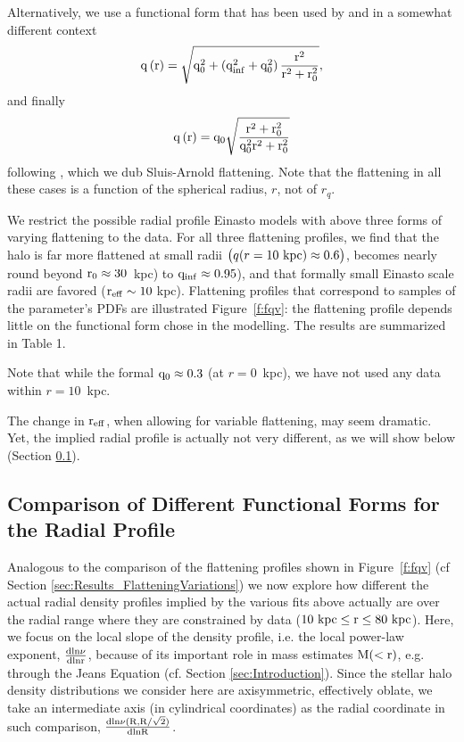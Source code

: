 \documentclass[12pt,preprint]{aastex}
\begin{document}
Alternatively, we use a functional form that has been used by \citep{Osipkov1979} and \citep{Merritt1985} in a somewhat different context
\begin{equation}
\rm q\left(r\right)=\sqrt{q_0^2+\left(q_{inf}^2+q_0^2\right)\frac{r^2}{r^2+r_0^2}},
\end{equation}
and finally 
\begin{equation}
\rm q\left(r\right)=q_0\sqrt{\frac{r^2+r_0^2}{q_0^2r^2+r_0^2}}
\end{equation}
following \citet{Sluis1998}, which we dub Sluis-Arnold flattening. 
Note that the flattening in all these cases is a function of the spherical radius, $r$, not of $r_q$.

We restrict the possible radial profile Einasto models with above three forms of varying flattening to the data. For all three flattening profiles, we find that the halo is far more flattened at small radii $\bigl ( q(r=10\rm~kpc)\approx 0.6\bigr )$, becomes nearly round beyond  $\rm r_0\approx 30$~kpc)  to $\rm q_{inf}\approx 0.95$),  and that formally small Einasto scale radii are favored ($\rm r_{eff} \sim 10~$kpc). Flattening profiles that correspond to samples of the parameter's PDFs are illustrated Figure~\ref{f:fqv}: the flattening profile depends little on the functional form chose in the modelling. The results are summarized in Table 1.   

Note that while the formal $\rm q_0\approx 0.3$ (at $r=0$~kpc), we have not used any data within $r=10$~kpc. 

The change in $\rm r_{eff}$, when allowing for variable flattening, may seem dramatic. Yet,
the implied radial profile is actually not very different, as we will show below (Section \ref{sec:ModelComparison}).

\subsection{Comparison of Different Functional Forms for the Radial Profile}\label{sec:ModelComparison}

Analogous to the comparison of the flattening profiles shown in Figure~\ref{f:fqv} 
(cf Section \ref{sec:Results_FlatteningVariations}) we now explore how different the 
actual radial density profiles implied by the various fits above actually are over the radial range where they are constrained by data ($10~\rm kpc \le \rm r \le 80~\rm kpc$). Here, we focus
on the local slope of the density profile, i.e. the local power-law exponent, $\rm \frac{dln\nu}{dlnr}$, because of its important role in mass estimates $\rm M(<r)$, e.g. through the Jeans Equation (cf. Section \ref{sec:Introduction}). Since the stellar halo density distributions we consider here are axisymmetric, effectively oblate, we take an intermediate axis (in cylindrical coordinates) as the radial coordinate 
in such comparison, $\rm \frac{dln\nu(R,R/\sqrt{2})}{dlnR}$.
\end{document}
